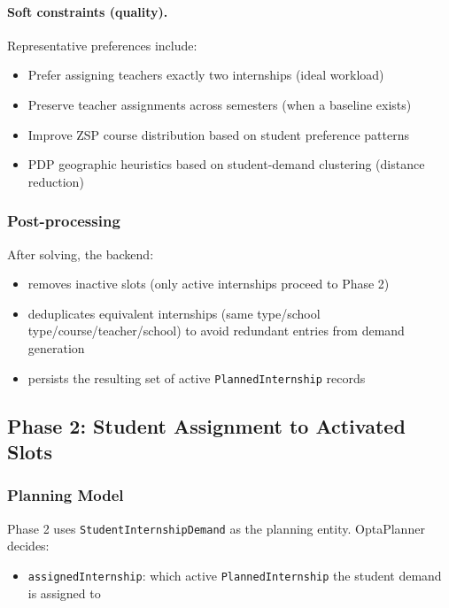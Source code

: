 \documentclass[12pt,a4paper]{report}
\begin{document}
\paragraph{Soft constraints (quality).}
Representative preferences include:
\begin{itemize}
    \item Prefer assigning teachers exactly two internships (ideal workload)
    \item Preserve teacher assignments across semesters (when a baseline exists)
    \item Improve ZSP course distribution based on student preference patterns
    \item PDP geographic heuristics based on student-demand clustering (distance reduction)
\end{itemize}

\subsubsection*{Post-processing}

After solving, the backend:
\begin{itemize}
    \item removes inactive slots (only active internships proceed to Phase 2)
    \item deduplicates equivalent internships (same type/school type/course/teacher/school) to avoid redundant entries from demand generation
    \item persists the resulting set of active \texttt{PlannedInternship} records
\end{itemize}

\subsection{Phase 2: Student Assignment to Activated Slots}

\subsubsection*{Planning Model}

Phase 2 uses \texttt{StudentInternshipDemand} as the planning entity. OptaPlanner decides:

\begin{itemize}
    \item \texttt{assignedInternship}: which active \texttt{PlannedInternship} the student demand is assigned to
\end{itemize}
\end{document}
